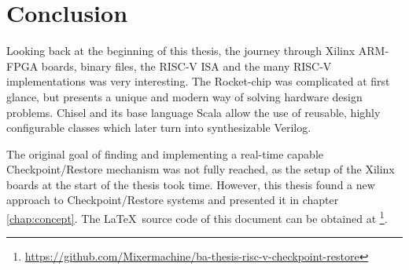 \chapter{Conclusion}\label{chap:conclusion}
Looking back at the beginning of this thesis, the journey through
Xilinx ARM-FPGA boards, binary files, the RISC-V ISA and the many
RISC-V implementations was very interesting.
The Rocket-chip was complicated at first glance, but
presents a unique and modern way of solving hardware design
problems. Chisel and its base language Scala allow the
use of reusable, highly configurable classes which later turn
into synthesizable Verilog.

The original goal of finding and implementing a real-time capable
Checkpoint/Restore mechanism was not fully reached, as the
setup of the Xilinx boards at the start of the thesis took
time. However, this thesis found a new approach to
Checkpoint/Restore systems and presented it in chapter \ref{chap:concept}.
\newline
\newline
The \LaTeX\ source code of this document can be obtained at \footnote{\url{https://github.com/Mixermachine/ba-thesis-risc-v-checkpoint-restore}}.